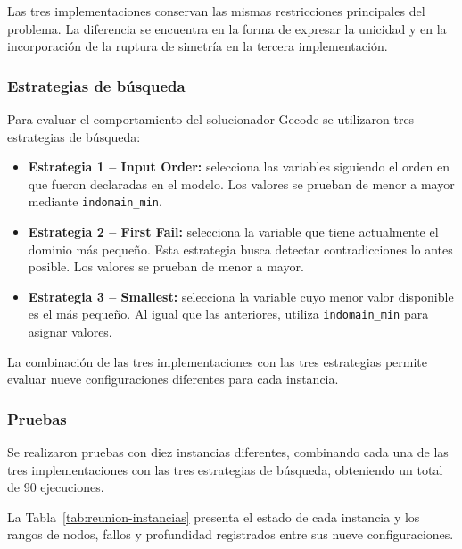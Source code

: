 Las tres implementaciones conservan las mismas restricciones principales del problema. La diferencia se encuentra en la forma de expresar la unicidad y en la incorporación de la ruptura de simetría en la tercera implementación.

\subsubsection{Estrategias de búsqueda}

Para evaluar el comportamiento del solucionador Gecode se utilizaron tres estrategias de búsqueda:

\begin{itemize}
    \item \textbf{Estrategia 1 -- Input Order:} selecciona las variables siguiendo el orden en que fueron declaradas en el modelo. Los valores se prueban de menor a mayor mediante \texttt{indomain\_min}.

    \item \textbf{Estrategia 2 -- First Fail:} selecciona la variable que tiene actualmente el dominio más pequeño. Esta estrategia busca detectar contradicciones lo antes posible. Los valores se prueban de menor a mayor.

    \item \textbf{Estrategia 3 -- Smallest:} selecciona la variable cuyo menor valor disponible es el más pequeño. Al igual que las anteriores, utiliza \texttt{indomain\_min} para asignar valores.
\end{itemize}

La combinación de las tres implementaciones con las tres estrategias permite evaluar nueve configuraciones diferentes para cada instancia.

\subsubsection{Pruebas}

Se realizaron pruebas con diez instancias diferentes, combinando cada una de las tres implementaciones con las tres estrategias de búsqueda, obteniendo un total de 90 ejecuciones.

La Tabla~\ref{tab:reunion-instancias} presenta el estado de cada instancia y los rangos de nodos, fallos y profundidad registrados entre sus nueve configuraciones.

